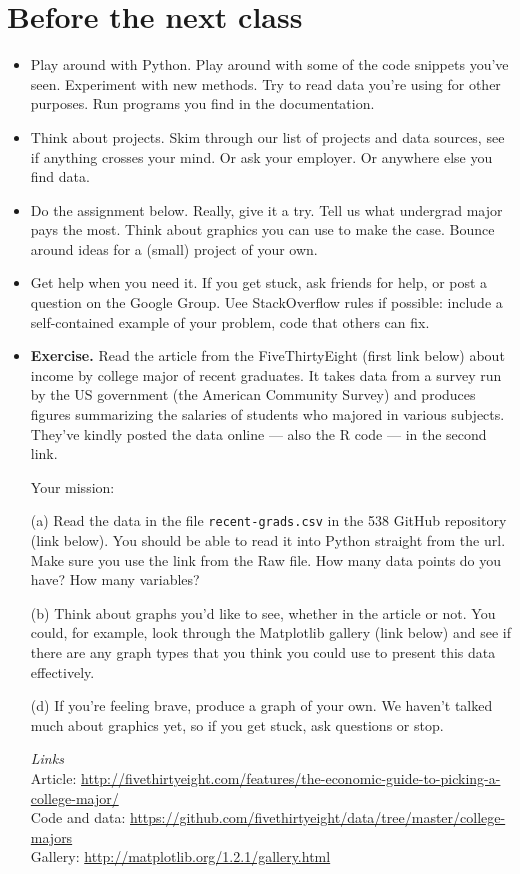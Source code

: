 \documentclass[11pt]{article}
\begin{document}
\section{Before the next class}

\begin{itemize}
\item Play around with Python.
Play around with some of the code snippets you've seen.
Experiment with new methods.
Try to read data you're using for other purposes.
Run programs you find in the documentation.

\item Think about projects.
Skim through our list of projects and data sources, see if anything crosses your mind.
Or ask your employer.  Or anywhere else you find data.

\item Do the assignment below.  Really, give it a try.  Tell us what undergrad major pays the most.
Think about graphics you can use to make the case.
Bounce around ideas for a (small) project of your own.

\item Get help when you need it.
If you get stuck, ask friends for help, or post a question on the Google Group.
Uee StackOverflow rules if possible:  include a self-contained example of your problem, code that others can fix.

\item {\bf Exercise.}
Read the article from the FiveThirtyEight (first link below) about income
by college major of recent graduates.
It takes data from a survey run by the US government (the American Community Survey) and
produces figures summarizing the salaries of students who majored in
various subjects.  They've kindly posted the data online --- also the R
code --- in the second link.

Your mission:

(a) Read the data in the file {\tt recent-grads.csv} in the 538 GitHub
repository (link below).
You should be able to read it into Python straight from the url.
Make sure you use the link from the Raw file.
How many data points do you have?  How many
variables?

(b) Think about graphs you'd like to see, whether in the article or
not.  You could, for example, look through the Matplotlib gallery
(link below) and see if there are any graph types that you think you
could use to present this data effectively.

(d) If you're feeling brave, produce a graph of your own.  We haven't
talked much about graphics yet, so if you get stuck, ask questions or stop.

{\it Links\/} \\
Article:  \url{http://fivethirtyeight.com/features/the-economic-guide-to-picking-a-college-major/} \\
Code and data:
\url{https://github.com/fivethirtyeight/data/tree/master/college-majors} \\
Gallery:  \url{http://matplotlib.org/1.2.1/gallery.html}


\end{itemize}
\end{document}

